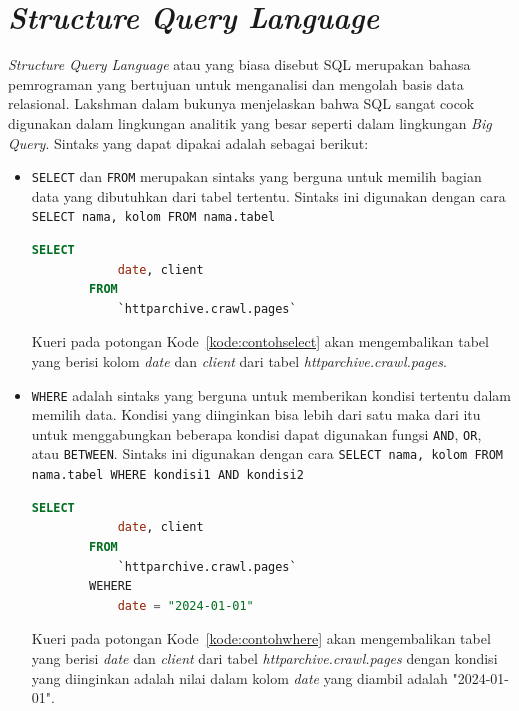 \section{\textit{Structure Query Language}~\cite{book:SQLBigQuery}}
\label{sec:sql} 
\textit{Structure Query Language} atau yang biasa disebut SQL merupakan bahasa pemrograman yang bertujuan untuk menganalisi dan mengolah basis data relasional. Lakshman dalam bukunya menjelaskan bahwa SQL sangat cocok digunakan dalam lingkungan analitik yang besar seperti dalam lingkungan \textit{Big Query}. Sintaks yang dapat dipakai adalah sebagai berikut:
\begin{itemize}
    \item \verb|SELECT| dan \verb|FROM| merupakan sintaks yang berguna untuk memilih bagian data yang dibutuhkan dari tabel tertentu. Sintaks ini digunakan dengan cara \verb|SELECT nama, kolom FROM nama.tabel|
    \begin{lstlisting}[language=SQL, caption=contoh penggunaan sintaks \lstinline|SELECT|, label=kode:contohselect]
        SELECT
            date, client
        FROM
            `httparchive.crawl.pages`
    \end{lstlisting}
    Kueri pada potongan Kode~\ref{kode:contohselect} akan mengembalikan tabel yang berisi kolom \textit{date} dan \textit{client} dari tabel \textit{httparchive.crawl.pages}.
    
    \item \verb|WHERE| adalah sintaks yang berguna untuk memberikan kondisi tertentu dalam memilih data. Kondisi yang diinginkan bisa lebih dari satu maka dari itu untuk menggabungkan beberapa kondisi dapat digunakan fungsi \verb|AND|, \verb|OR|, atau \verb|BETWEEN|. Sintaks ini digunakan dengan cara \verb|SELECT nama, kolom FROM nama.tabel WHERE kondisi1 AND kondisi2|
        \begin{lstlisting}[language=SQL, caption=contoh penggunaan sintaks \lstinline|WHERE|, label=kode:contohwhere]
        SELECT
            date, client
        FROM
            `httparchive.crawl.pages`
        WEHERE
            date = "2024-01-01"
    \end{lstlisting}
    Kueri pada potongan Kode~\ref{kode:contohwhere} akan mengembalikan tabel yang berisi \textit{date} dan \textit{client} dari tabel \textit{httparchive.crawl.pages} dengan kondisi yang diinginkan adalah nilai dalam kolom \textit{date} yang diambil adalah "2024-01-01".
    

\end{itemize}

